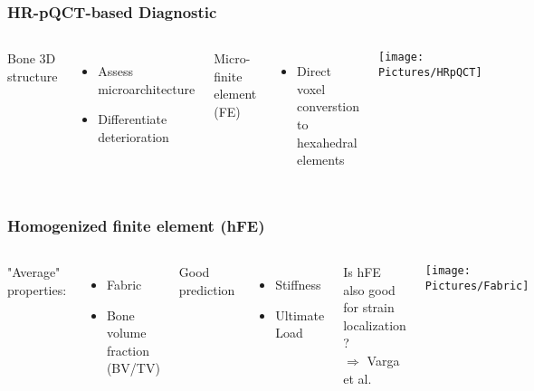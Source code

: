\documentclass[xcolor=table,11pt]{beamer}
\begin{document}
	\begin{frame}
		\frametitle{HR-pQCT-based Diagnostic}

		\begin{columns}
			Bone 3D structure
			\begin{itemize}
				\item Assess microarchitecture
				\item Differentiate deterioration \cite{p6}
			\end{itemize}
	
			\vspace{10mm}
	
			Micro-finite element (\si{\mu}FE)
			\begin{itemize}
				\item Direct voxel converstion to hexahedral elements
			\end{itemize}

			\centering
			\texttt{[image: Pictures/HRpQCT]}

		\end{columns}

	\end{frame}

	\begin{frame}
		\frametitle{Homogenized finite element (hFE)}

		\begin{columns}
			\column{0.60\linewidth}
			
				"Average" properties:
				\begin{itemize}
					\item Fabric
					\item Bone volume fraction (BV/TV)
				\end{itemize}

				\vspace{5mm}

				Good prediction \cite{p13}
				\begin{itemize}
					\item Stiffness
					\item Ultimate Load
				\end{itemize}
	
			\vspace{5mm}
			Is hFE also good for strain localization ?\\$\Rightarrow$ Varga et al. \cite{p7}

			\column{0.35\linewidth}
			\texttt{[image: Pictures/Fabric]}\\
		\end{columns}
	\end{frame}
\end{document}
